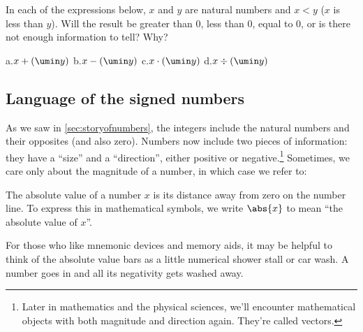 \begin{boxedexplore}
In each of the expressions below, $x$ and $y$ are natural numbers and $x<y$ ($x$ is less than $y$). Will the result be greater than 0, less than 0, equal to 0, or is there not enough information to tell? Why?

a.\quad $x+(\umin y)$
\hfill
b.\quad $x-(\umin y)$
\hfill
c.\quad $x \cdot (\umin y)$
\hfill
d.\quad $x \div (\umin y)$
\hfill
\end{boxedexplore}

\subsection{Language of the signed numbers}

As we saw in \cref{sec:storyofnumbers}, the integers include the natural numbers and their opposites (and also zero). Numbers now include two pieces of information: they have a ``size'' and a ``direction'', either positive or negative.\footnote{Later in mathematics and the physical sciences, we'll encounter mathematical objects with both magnitude and direction again. They're called vectors.} Sometimes, we care only about the magnitude of a number, in which case we refer to:

\begin{boxeddef}
The \gls{absolute value} of a number $x$ is its distance away from zero on the number line. To express this in mathematical symbols, we write $\abs{x}$ to mean ``the absolute value of $x$''.
\end{boxeddef}

For those who like mnemonic devices and memory aids, it may be helpful to think of the absolute value bars as a little numerical shower stall or car wash. A number goes in and all its negativity gets washed away.


%

